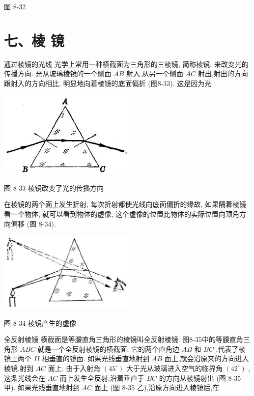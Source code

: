 \documentclass[10pt]{article}
\begin{document}
图 8-32

\section*{七、棱 镜}

通过棱镜的光线 光学上常用一种横截面为三角形的三棱镜, 简称棱镜, 来改变光的传播方向. 光从玻璃棱镜的一个侧面 \({AB}\) 射入,从另一个侧面 \({AC}\) 射出,射出的方向跟射入的方向相比, 明显地向着棱镜的底面偏折 (图8-33). 这是因为光

\begin{center}
\includegraphics[max width=0.5\textwidth]{images/01913056-1f15-74d8-9184-9aab52c9d66b_270_460581.jpg}
\end{center}

图 8-33 棱镜改变了光的传播方向

在棱镜的两个面上发生折射, 每次折射都使光线向底面偏折的缘故. 如果隔着棱镜看一个物体, 就可以看到物体的虚像, 这个虚像的位置比物体的实际位置向顶角方向偏移 (图 8-34).

\begin{center}
\includegraphics[max width=0.5\textwidth]{images/01913056-1f15-74d8-9184-9aab52c9d66b_271_317469.jpg}
\end{center}

图 8-34 棱镜产生的虚像

全反射棱镜 横截面是等腰直角三角形的棱镜叫全反射棱镜. 图8-35中的等腰直角三角形 \({ABC}\) 就是一个全反射棱镜的横截面; 它的两个直角边 \({AB}\) 和 \({BC}\) ,代表了棱镜上两个 \(I\dot{I}\) 相垂直的镜面. 如果光线垂直地射到 \({AB}\) 面上,就会沿原来的方向进入棱镜,射到 \({AC}\) 面上. 由于入射角 \(\left( {45}^{ \circ }\right)\) 大于光从玻璃进入空气的临界角 \(\left( {42}^{ \circ }\right)\) ,这条光线会在 \({AC}\) 而上发生全反射,沿着垂直于 \({BC}\) 的方向从棱镜射出 (图 8-35 甲). 如果光线垂直地射到 \({AC}\) 面上 (图 8-35 乙),沿原方向进入棱镜后,在
\end{document}
